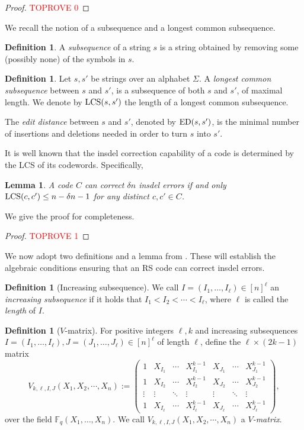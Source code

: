 \documentclass[11pt]{article}
\theoremstyle{plain}
\newtheorem{lemma}[thm]{Lemma}
\theoremstyle{definition}
\newtheorem{defn}[thm]{Definition}
\theoremstyle{remark}
\newcommand{\F}{\mathbb{F}}
\newcommand{\ed}[2]{\textup{ED}(#1, #2)}
\begin{document}
\begin{proof}\textcolor{red}{TOPROVE 0}\end{proof}

We recall the notion of a subsequence and a longest common subsequence. 
\begin{defn}
        A \emph{subsequence} of a string $s$ is a string obtained by removing some (possibly none) of the symbols in $s$. 
\end{defn}
	\begin{defn}
	
		Let $s,s'$ be strings over an alphabet $\Sigma$. 
		A \emph{longest common subsequence} between $s$ and $s'$, is a subsequence of both $s$ and $s'$, of maximal length. We denote by $ \textup{LCS}(s,s')$ the length of a longest common subsequence.
		
	The \emph{edit distance} between $s$ and $s'$, denoted by $\ed{s}{s'}$, is the minimal number of insertions and deletions needed in order to turn $s$ into $s'$. 
\end{defn}

It is well known that the insdel correction capability of a code is determined by the LCS of its codewords. Specifically,
\begin{lemma} \label{lem:code-lcs}
    A code $C$ can correct $\delta n$ insdel errors if and only $\textup{LCS}(c,c')\leq n - \delta n - 1$ for any distinct $c,c'\in C$.
\end{lemma}
We give the proof for completeness.
\begin{proof}\textcolor{red}{TOPROVE 1}\end{proof}

We now adopt two definitions and a lemma from \cite{con2023reed}. These will establish the algebraic conditions ensuring that an RS code can correct insdel errors.

\begin{defn}[Increasing subsequence]
    We call $I=(I_1,\dots,I_\ell)\in[n]^\ell$ an \emph{increasing subsequence} if it holds that $ I_1<I_2<\cdots<I_\ell$, where $\ell$ is called the \emph{length} of $I$.
\end{defn}

\begin{defn}[$V$-matrix]\label{matrix} 
For positive integers $\ell, k$ and increasing subsequences $I=(I_1,\dots,I_\ell),J=(J_1,\dots,J_\ell)\in [n]^{\ell}$ of length $\ell$, define the $\ell\times(2k-1)$ matrix
\[
V_{k,\ell,I,J}(X_1,X_2,\cdots,X_n):=\left(\begin{array}{ccccccc}1 & X_{I_1} & \cdots & X_{I_1}^{k-1} & X_{J_1} & \cdots & X_{J_1}^{k-1} \\1 & X_{I_2} & \cdots & X_{I_2}^{k-1} & X_{J_2} & \cdots & X_{J_2}^{k-1} \\ \vdots& \vdots & \ddots& \vdots & \vdots & \ddots & \vdots \\1 & X_{I_\ell} & \cdots & X_{I_\ell}^{k-1} & X_{J_\ell} & \cdots & X_{J_\ell}^{k-1}\end{array}\right),
\]
over the field 
$\F_q(X_1,\dots,X_n)$. We call $V_{k,\ell,I,J}(X_1,X_2,\cdots,X_n)$
a \emph{$V$-matrix}. 
\end{defn}
\end{document}
